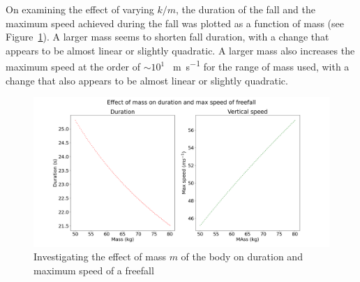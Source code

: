 \documentclass[hyphens,twocolumn,nobalancelastpage,aps,10pt,citeautoscript,longbibliography]{revtex4-2}
\begin{document}
On examining the effect of varying $k/m$, the duration of the fall and the
maximum speed achieved during the fall was plotted as a function of mass (see
Figure~\ref{fig:mass_duration_speed}). A larger mass seems to shorten fall
duration, with a change that appears to be almost linear or slightly quadratic.
A larger mass also increases the maximum speed at the order of $\sim 10^1$
\qty{}{\metre\per\second} for the range of mass used, with a change that also
appears to be almost linear or slightly quadratic.
\begin{figure}[htpb]
	\centering
	\includegraphics[width=\linewidth]{mass_duration_speed.png}
	\caption{Investigating the effect of mass $m$ of the body on duration and maximum speed of a freefall}%
	\label{fig:mass_duration_speed}
\end{figure}
\end{document}
